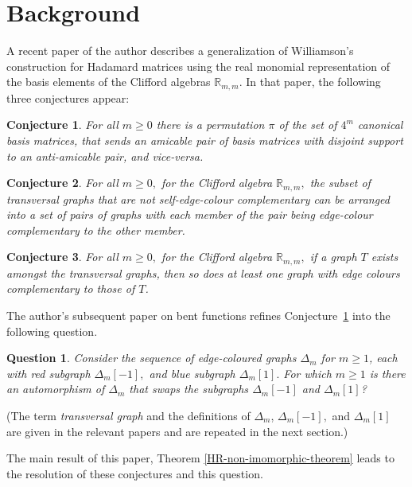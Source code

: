 \documentclass[12pt,a4paper]{article}
\newcommand{\mb}[1]{\mathbb{#1}}
\newcommand{\R}{\mb{R}}
\newtheorem{Conjecture}{Conjecture}
\newtheorem{Question}{Question}
\begin{document}
\section{Background}\label{sec-Background}
A recent paper of the author \cite{Leo14Constructions} describes a generalization of
Williamson's construction for Hada\-mard matrices \cite{Wil44}
using the real monomial representation of the basis elements of the Clifford algebras $\R_{m,m}$.
In that paper, the following three conjectures appear:

\begin{Conjecture}\label{conjecture-1}
%
For all $m \geqslant 0$ there is a permutation $\pi$ of the set of $4^m$ canonical basis matrices,
that sends an amicable pair of basis matrices with disjoint support to an anti-amicable pair, and vice-versa.
%
\end{Conjecture}

\begin{Conjecture}\label{conjecture-2}
%
For all $m \geqslant 0,$ 
for the Clifford algebra $\R_{m,m},$ the subset of transversal graphs that are 
not self-edge-colour complementary
can be arranged into a set of pairs of graphs with each member of the pair 
being edge-colour complementary to the other member.
%
\end{Conjecture}

\begin{Conjecture}\label{conjecture-3}
%
For all $m \geqslant 0,$ 
for the Clifford algebra $\R_{m,m},$ if a graph $T$ exists amongst the transversal graphs,
then so does at least one graph with edge colours complementary to those of $T$.
%
\end{Conjecture}

The author's subsequent paper on bent functions \cite{Leo15Bent} 
refines Conjecture~\ref{conjecture-1} into the following question.
\begin{Question}
\label{Question-1}
Consider the sequence of edge-coloured graphs $\varDelta_m$ for $m \geqslant 1$,
each with red subgraph $\varDelta_m[-1],$ and blue subgraph $\varDelta_m[1].$
For which $m \geqslant 1$ is there an automorphism of $\varDelta_m$ 
that swaps the subgraphs $\varDelta_m[-1]$ and $\varDelta_m[1]$?
\end{Question}
 
(The term \emph{transversal graph} and the definitions of $\varDelta_m$, $\varDelta_m[-1],$ and $\varDelta_m[1]$ 
are given in the relevant papers and are repeated in the next section.)

The main result of this paper, Theorem \ref{HR-non-imomorphic-theorem} leads to the resolution of these conjectures and this question.
\end{document}
